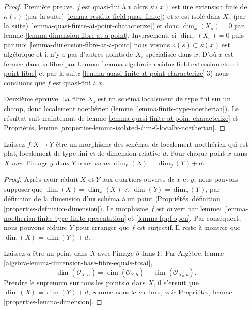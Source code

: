\begin{proof}

Première preuve. $f$ est quasi-fini à $x$ alors $\kappa(x)$ est une extension finie de
$\kappa(s)$ (par la suite) \ref{lemma-residue-field-quasi-finite}) et $x$ est isolé dans $X_s$ (par la suite) \ref{lemma-quasi-finite-at-point-characterize}) et donc $\dim_x(X_s) = 0$ par lemme \ref{lemma-dimension-fibre-at-a-point}. Inversement, si $\dim_x(X_s) = 0$ puis par moi \ref{lemma-dimension-fibre-at-a-point}
nous voyons $\kappa(s) \subset \kappa(x)$ est algébrique et il n'y a pas d'autres points de $X_s$ spécialisée dans $x$. D'où $x$ est fermée dans sa fibre par Lemme \ref{lemma-algebraic-residue-field-extension-closed-point-fibre}
et par la suite \ref{lemma-quasi-finite-at-point-characterize} 3) nous concluons que $f$ est quasi-fini à $x$.

\medskip\noindent
Deuxième épreuve. La fibre $X_s$ est un schéma localement de type fini sur un champ, donc localement noethérien (lemme \ref{lemma-finite-type-noetherian}). Le résultat suit maintenant de lemme \ref{lemma-quasi-finite-at-point-characterize} et Propriétés, lemme \ref{properties-lemma-isolated-dim-0-locally-noetherian}.
\end{proof}

\begin{lemma}

\label{lemma-rel-dimension-dimension}
Laissez $f : X \to Y$ être un morphisme des schémas de localement noethérien qui est plat, localement de type fini et de dimension relative $d$. Pour chaque point $x$ dans $X$ avec l'image $y$ dans $Y$ nous avons $\dim_x(X) = \dim_y(Y) + d$.
\end{lemma}

\begin{proof}
Après avoir réduit $X$ et $Y$ aux quartiers ouverts de $x$ et $y$, nous pouvons supposer que $\dim(X) = \dim_x(X)$ et $\dim(Y) = \dim_y(Y)$, par définition de la dimension d'un schéma à un point (Propriétés, définition \ref{properties-definition-dimension}). Le morphisme $f$ est ouvert par lemmes \ref{lemma-noetherian-finite-type-finite-presentation} et \ref{lemma-fppf-open}. Par conséquent, nous pouvons réduire $Y$ pour arranger que $f$ est surjectif. Il reste à montrer que $\dim(X) = \dim(Y) + d$.

\medskip\noindent
Laissez $a$ être un point dans $X$ avec l'image $b$ dans $Y$. Par Algèbre, lemme \ref{algebra-lemma-dimension-base-fibre-equals-total}, $$
\dim(\mathcal{O}_{X,a}) = \dim(\mathcal{O}_{Y,b}) + \dim(\mathcal{O}_{X_b, a}).
$$ Prendre le supremum sur tous les points $a$ dans $X$, il s'ensuit que $\dim(X) = \dim(Y) + d$, comme nous le voulons, voir Propriétés, lemme \ref{properties-lemma-dimension}.
\end{proof}











